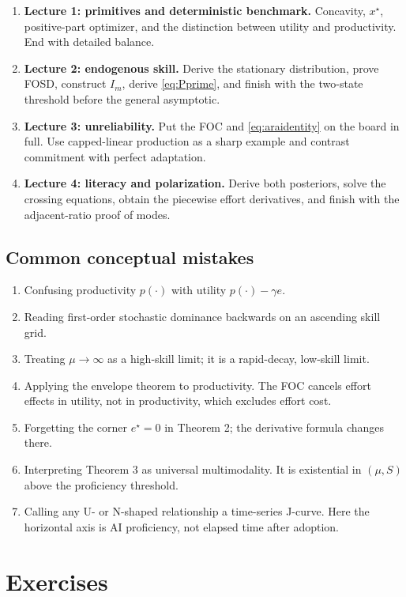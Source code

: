 \documentclass[11pt]{article}
\theoremstyle{tutorial}
\theoremstyle{remark}
\newcommand{\1}{\mathbb{I}}
\begin{document}
\begin{enumerate}
  \item \textbf{Lecture 1: primitives and deterministic benchmark.} Concavity, $x^\star$, positive-part
  optimizer, and the distinction between utility and productivity.  End with detailed balance.
  \item \textbf{Lecture 2: endogenous skill.} Derive the stationary distribution, prove FOSD, construct
  $I_m$, derive \eqref{eq:Pprime}, and finish with the two-state threshold before the general asymptotic.
  \item \textbf{Lecture 3: unreliability.} Put the FOC and \eqref{eq:araidentity} on the board in full.
  Use capped-linear production as a sharp example and contrast commitment with perfect adaptation.
  \item \textbf{Lecture 4: literacy and polarization.} Derive both posteriors, solve the crossing equations,
  obtain the piecewise effort derivatives, and finish with the adjacent-ratio proof of modes.
\end{enumerate}

\subsection{Common conceptual mistakes}

\begin{enumerate}
  \item Confusing productivity $p(\cdot)$ with utility $p(\cdot)-\gamma e$.
  \item Reading first-order stochastic dominance backwards on an ascending skill grid.
  \item Treating $\mu\to\infty$ as a high-skill limit; it is a rapid-decay, low-skill limit.
  \item Applying the envelope theorem to productivity.  The FOC cancels effort effects in utility, not in
  productivity, which excludes effort cost.
  \item Forgetting the corner $e^\star=0$ in Theorem 2; the derivative formula changes there.
  \item Interpreting Theorem 3 as universal multimodality.  It is existential in $(\mu,S)$ above the
  proficiency threshold.
  \item Calling any U- or N-shaped relationship a time-series J-curve.  Here the horizontal axis is AI
  proficiency, not elapsed time after adoption.
\end{enumerate}

\section{Exercises}
\end{document}

